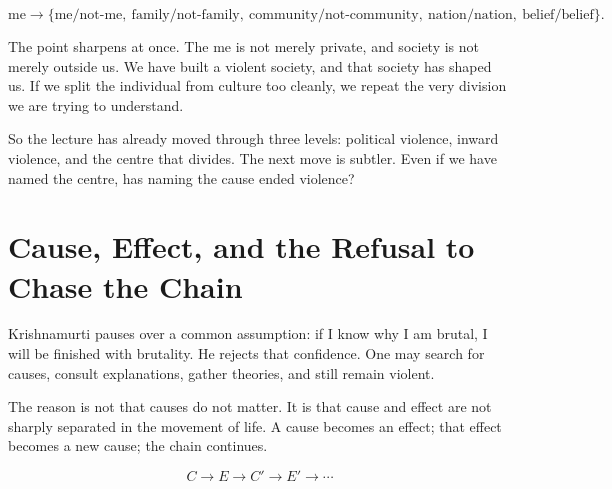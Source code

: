 \begin{equation}
\text{me}
\rightarrow
\{\text{me/not-me},\ \text{family/not-family},\ \text{community/not-community},\ \text{nation/nation},\ \text{belief/belief}\}.
\end{equation}

The point sharpens at once. The me is not merely private, and society is not merely outside us. We have built a violent society, and that society has shaped us. If we split the individual from culture too cleanly, we repeat the very division we are trying to understand.

\begin{figure}
\centering
{}
\end{figure}

So the lecture has already moved through three levels: political violence, inward violence, and the centre that divides. The next move is subtler. Even if we have named the centre, has naming the cause ended violence?

\section{Cause, Effect, and the Refusal to Chase the Chain}

Krishnamurti pauses over a common assumption: if I know why I am brutal, I will be finished with brutality. He rejects that confidence. One may search for causes, consult explanations, gather theories, and still remain violent.

The reason is not that causes do not matter. It is that cause and effect are not sharply separated in the movement of life. A cause becomes an effect; that effect becomes a new cause; the chain continues.

\begin{equation}
C \rightarrow E \rightarrow C' \rightarrow E' \rightarrow \cdots
\end{equation}

